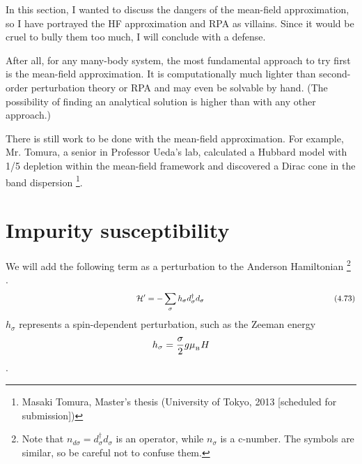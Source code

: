 \documentclass[a4j]{jarticle}
\begin{document}
${}$

In this section, I wanted to discuss the dangers of the mean-field approximation, so I have portrayed the HF approximation and RPA as villains.
Since it would be cruel to bully them too much, I will conclude with a defense.

After all, for any many-body system, the most fundamental approach to try first is the mean-field approximation.
It is computationally much lighter than second-order perturbation theory or RPA and may even be solvable by hand.
(The possibility of finding an analytical solution is higher than with any other approach.)

There is still work to be done with the mean-field approximation.
For example, Mr. Tomura, a senior in Professor Ueda's lab, calculated a Hubbard model with 1/5 depletion within the mean-field framework and discovered a Dirac cone in the band dispersion
\footnote{
	Masaki Tomura, Master's thesis (University of Tokyo, 2013 [scheduled for submission])
}.

\section*{Impurity susceptibility}

We will add the following term as a perturbation to the Anderson Hamiltonian
\footnote{
	Note that $n_{d \sigma}=d_{\sigma}^{\dagger}
		d_{\sigma}$
	is an operator, while
	$n_{\sigma}$
	is a c-number.
	The symbols are similar, so be careful not to confuse them.
}
.
\begin{align}
	\hspace{55.5mm}
	\mathcal{H}'= - \sum_{\sigma}
	h_{\sigma}
	d_{\sigma}^{\dagger}
	d_{\sigma}
	\nonumber
	\hspace{55.5mm}
	(4.73)
\end{align}
$h_{\sigma}$ represents a spin-dependent perturbation, such as the Zeeman energy
\begin{align}
	h_{\sigma}
	=
	\frac{\sigma}{2}
	g
	\mu_{{}_{\rm B}}
	H
\end{align}
.
\end{document}
